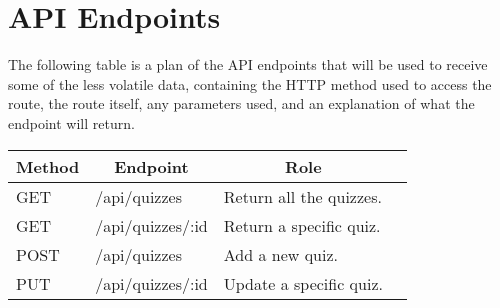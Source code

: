 \section{API Endpoints}
The following table is a plan of the API endpoints that will be used to receive some of the less volatile data, containing the HTTP method used to access the route, the route itself, any parameters used, and an explanation of what the endpoint will return.

\begin{table}[]
\centering
\label{my-label}
\begin{tabular}{|l|l|l|l|}
\hline
\multicolumn{1}{|c|}{{\bf Method}} & \multicolumn{1}{c|}{{\bf Endpoint}} & \multicolumn{1}{c|}{{\bf Role}} \\ \hline
GET                                & /api/quizzes                                                       & Return all the quizzes.         \\ \hline
GET                                & /api/quizzes/:id                                & Return a specific quiz.         \\ \hline
POST                               & /api/quizzes                                                       & Add a new quiz.                 \\ \hline
PUT                                & /api/quizzes/:id                                & Update a specific quiz.         \\ \hline
\end{tabular}
\end{table}
